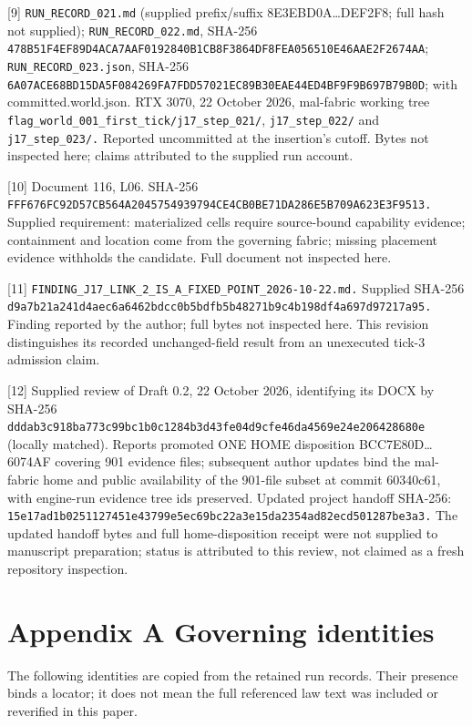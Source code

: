 \documentclass[
]{article}
\begin{document}
{[}9{]} \nolinkurl{RUN_RECORD_021.md} (supplied prefix/suffix
8E3EBD0A\ldots DEF2F8; full hash not supplied);
\nolinkurl{RUN_RECORD_022.md}, SHA-256
\nolinkurl{478B51F4EF89D4ACA7AAF0192840B1CB8F3864DF8FEA056510E46AAE2F2674AA};
\nolinkurl{RUN_RECORD_023.json}, SHA-256
\nolinkurl{6A07ACE68BD15DA5F084269FA7FDD57021EC89B30EAE44ED4BF9F9B697B79B0D};
with committed.world.json. RTX 3070, 22 October 2026, mal-fabric working
tree \nolinkurl{flag_world_001_first_tick/j17_step_021/},
\nolinkurl{j17_step_022/} and \nolinkurl{j17_step_023/.} Reported
uncommitted at the insertion's cutoff. Bytes not inspected here; claims
attributed to the supplied run account.

{[}10{]} Document 116, L06. SHA-256
\nolinkurl{FFF676FC92D57CB564A2045754939794CE4CB0BE71DA286E5B709A623E3F9513.}
Supplied requirement: materialized cells require source-bound capability
evidence; containment and location come from the governing fabric;
missing placement evidence withholds the candidate. Full document not
inspected here.

{[}11{]} \nolinkurl{FINDING_J17_LINK_2_IS_A_FIXED_POINT_2026-10-22.md.}
Supplied SHA-256
\nolinkurl{d9a7b21a241d4aec6a6462bdcc0b5bdfb5b48271b9c4b198df4a697d97217a95.}
Finding reported by the author; full bytes not inspected here. This
revision distinguishes its recorded unchanged-field result from an
unexecuted tick-3 admission claim.

{[}12{]} Supplied review of Draft 0.2, 22 October 2026, identifying its
DOCX by SHA-256
\nolinkurl{dddab3c918ba773c99bc1b0c1284b3d43fe04d9cfe46da4569e24e206428680e}
(locally matched). Reports promoted ONE HOME disposition
BCC7E80D\ldots6074AF covering 901 evidence files; subsequent author
updates bind the mal-fabric home and public availability of the 901-file
subset at commit 60340c61, with engine-run evidence tree ids preserved.
Updated project handoff SHA-256:
\nolinkurl{15e17ad1b0251127451e43799e5ec69bc22a3e15da2354ad82ecd501287be3a3.}
The updated handoff bytes and full home-disposition receipt were not
supplied to manuscript preparation; status is attributed to this review,
not claimed as a fresh repository inspection.

\section{Appendix A Governing
identities}\label{appendix-a-governing-identities}

The following identities are copied from the retained run records. Their
presence binds a locator; it does not mean the full referenced law text
was included or reverified in this paper.
\end{document}

